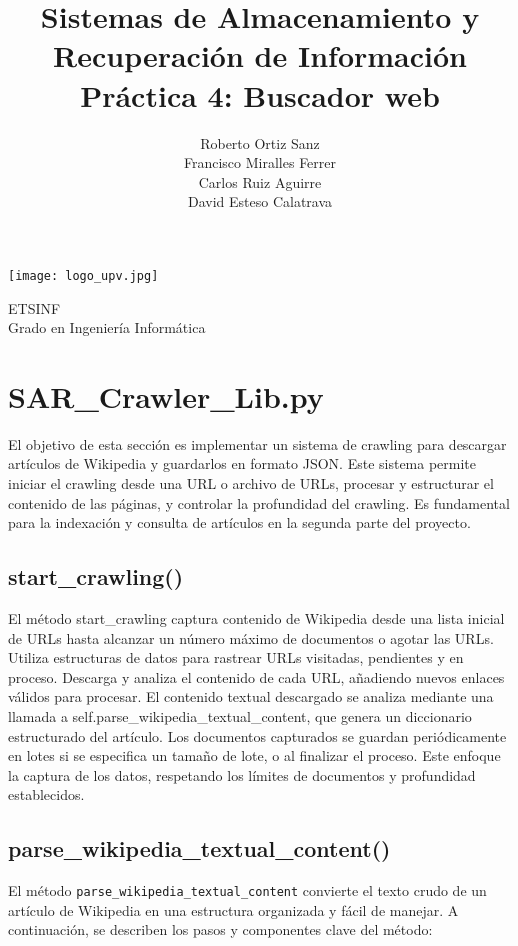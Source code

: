 \documentclass[12pt,a4paper]{article}
\title{\textbf{Sistemas de Almacenamiento y\\ Recuperación de Información\\Práctica 4: Buscador web}}
\author{Roberto Ortiz Sanz \\ Francisco Miralles Ferrer \\ Carlos Ruiz Aguirre \\ David Esteso Calatrava}
\begin{document}
\begin{titlepage}
\maketitle
\begin{center}

\vspace{10mm}

\texttt{[image: logo\_upv.jpg]}

\vfill

\large
ETSINF\\
Grado en Ingeniería Informática
\end{center}
\end{titlepage}

\tableofcontents

\newpage

\section{SAR\_Crawler\_Lib.py}

El objetivo de esta sección es implementar un sistema de crawling  para descargar artículos de Wikipedia  y guardarlos en formato JSON. Este sistema permite iniciar el crawling desde una URL o archivo de URLs, procesar y estructurar el contenido de las páginas, y controlar la profundidad del crawling. Es fundamental para la indexación y consulta de artículos en la segunda parte del proyecto.

\subsection{start\_crawling()}
El método start\_crawling captura contenido de Wikipedia desde una lista inicial de URLs hasta alcanzar un número máximo de documentos o agotar las URLs. Utiliza estructuras de datos para rastrear URLs visitadas, pendientes y en proceso. Descarga y analiza el contenido de cada URL, añadiendo nuevos enlaces válidos para procesar. El contenido textual descargado se analiza mediante una llamada a self.parse\_wikipedia\_textual\_content, que genera un diccionario estructurado del artículo. Los documentos capturados se guardan periódicamente en lotes si se especifica un tamaño de lote, o al finalizar el proceso. Este enfoque la captura de los datos, respetando los límites de documentos y profundidad establecidos.
\subsection{parse\_wikipedia\_textual\_content()}
El método \texttt{parse\_wikipedia\_textual\_content} convierte el texto crudo de un artículo de Wikipedia en una estructura organizada y fácil de manejar. A continuación, se describen los pasos y componentes clave del método:
\end{document}
